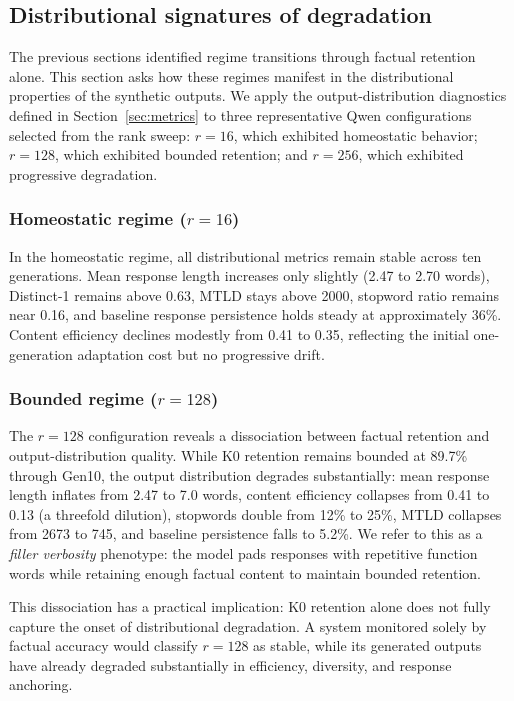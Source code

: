 \documentclass[a4paper,fleqn]{cas-dc}
\begin{document}
\subsection{Distributional signatures of degradation}\label{sec:res_distribution}

The previous sections identified regime transitions through factual retention
alone. This section asks how these regimes manifest in the distributional
properties of the synthetic outputs. We apply the output-distribution diagnostics
defined in Section~\ref{sec:metrics} to three representative Qwen configurations
selected from the rank sweep: $r=16$, which exhibited homeostatic behavior;
$r=128$, which exhibited bounded retention; and $r=256$, which exhibited
progressive degradation.

\subsubsection{Homeostatic regime ($r=16$)}
In the homeostatic regime, all distributional metrics remain stable across ten
generations. Mean response length increases only slightly (2.47 to 2.70 words),
Distinct-1 remains above 0.63, MTLD stays above 2000, stopword ratio remains
near 0.16, and baseline response persistence holds steady at approximately 36\%.
Content efficiency declines modestly from 0.41 to 0.35, reflecting the initial
one-generation adaptation cost but no progressive drift.

\subsubsection{Bounded regime ($r=128$)}
The $r=128$ configuration reveals a dissociation between factual retention and
output-distribution quality. While K0 retention remains bounded at 89.7\% through
Gen10, the output distribution degrades substantially: mean response length
inflates from 2.47 to 7.0 words, content efficiency collapses from 0.41 to 0.13
(a threefold dilution), stopwords double from 12\% to 25\%, MTLD collapses from
2673 to 745, and baseline persistence falls to 5.2\%. We refer to this as a
\textit{filler verbosity} phenotype: the model pads responses with repetitive
function words while retaining enough factual content to maintain bounded
retention.

This dissociation has a practical implication: K0 retention alone does not fully
capture the onset of distributional degradation. A system monitored solely by
factual accuracy would classify $r=128$ as stable, while its generated outputs
have already degraded substantially in efficiency, diversity, and response
anchoring.
\end{document}
